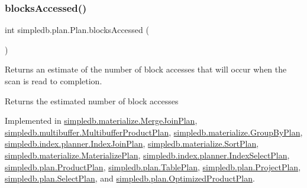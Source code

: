 \subsubsection{\texorpdfstring{blocks\+Accessed()}{blocksAccessed()}}
{\footnotesize\ttfamily int simpledb.\+plan.\+Plan.\+blocks\+Accessed (\begin{DoxyParamCaption}{ }\end{DoxyParamCaption})}

Returns an estimate of the number of block accesses that will occur when the scan is read to completion. \begin{DoxyReturn}{Returns}
the estimated number of block accesses 
\end{DoxyReturn}


Implemented in \hyperlink{classsimpledb_1_1materialize_1_1MergeJoinPlan_a4ceef561ece4dad75dd41e46ff5d184c}{simpledb.\+materialize.\+Merge\+Join\+Plan}, \hyperlink{classsimpledb_1_1multibuffer_1_1MultibufferProductPlan_a5e3555f5da62f198a1d0e8d1b73a3d0d}{simpledb.\+multibuffer.\+Multibuffer\+Product\+Plan}, \hyperlink{classsimpledb_1_1materialize_1_1GroupByPlan_a741eec5aa2c6dc59f1814a4268a3af46}{simpledb.\+materialize.\+Group\+By\+Plan}, \hyperlink{classsimpledb_1_1index_1_1planner_1_1IndexJoinPlan_a6189cff464c671000c394b56616e4f89}{simpledb.\+index.\+planner.\+Index\+Join\+Plan}, \hyperlink{classsimpledb_1_1materialize_1_1SortPlan_ab5541a8f02fbd3b751dfdb2af86283e0}{simpledb.\+materialize.\+Sort\+Plan}, \hyperlink{classsimpledb_1_1materialize_1_1MaterializePlan_a17e5dc3ecdd3ea848ad34c796f988da1}{simpledb.\+materialize.\+Materialize\+Plan}, \hyperlink{classsimpledb_1_1index_1_1planner_1_1IndexSelectPlan_ae88ded6d91db76c651532f94a59ef97a}{simpledb.\+index.\+planner.\+Index\+Select\+Plan}, \hyperlink{classsimpledb_1_1plan_1_1ProductPlan_aed99978816a650c8f9268bb842d75a5b}{simpledb.\+plan.\+Product\+Plan}, \hyperlink{classsimpledb_1_1plan_1_1TablePlan_a02096e40476829aa8df6de4519bfee33}{simpledb.\+plan.\+Table\+Plan}, \hyperlink{classsimpledb_1_1plan_1_1ProjectPlan_a179e4f2151d40cef19af2117bb790112}{simpledb.\+plan.\+Project\+Plan}, \hyperlink{classsimpledb_1_1plan_1_1SelectPlan_aac8710bb3dcdab26ccd276ccb19f95cb}{simpledb.\+plan.\+Select\+Plan}, and \hyperlink{classsimpledb_1_1plan_1_1OptimizedProductPlan_a52b0ca647203a27b037e001abda794ae}{simpledb.\+plan.\+Optimized\+Product\+Plan}.

\mbox{\label{interfacesimpledb_1_1plan_1_1Plan_a55094c16c756b0c09b5c71b94d573271}} 
